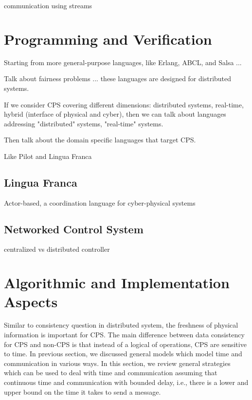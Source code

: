 \documentclass[
graybox,
envcountchap
]{svmult}
\begin{document}
\begin{bibunit}
    communication using streams
    
\section{Programming and Verification}\label{sec:Programming}

Starting from more general-purpose languages, like Erlang, ABCL, and Salsa ...

Talk about fairness problems ... these languages are designed for distributed systems.

If we consider CPS covering different dimensions: distributed systems, real-time, hybrid (interface of physical and cyber), then we can talk about languages addressing "distributed" systems,  "real-time" systems.

Then talk about the domain specific languages that target CPS.

Like Pilot and Lingua Franca

\subsection{Lingua Franca}
Actor-based, a coordination language for cyber-physical systems


    \subsection{Networked Control System}

    centralized vs distributed controller

\section{Algorithmic and Implementation Aspects}

    Similar to consistency question in distributed system, the freshness of physical information is important for CPS.
    The main difference between data consistency for CPS and non-CPS is that instead of a logical of operations, CPS are sensitive to time.
    In previous section, we discussed general models which model time and communication in various ways.
    In this section, we review general strategies which can be used to deal with time and communication assuming that continuous time and communication with bounded delay, i.e., there is a lower and upper bound on the time it takes to send a message.


\end{bibunit}
\end{document}
